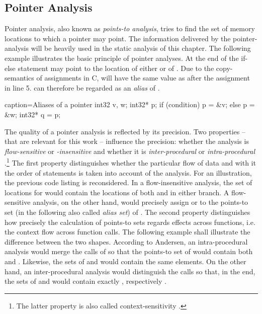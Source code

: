\subsection{Pointer Analysis}
Pointer analysis, also known as \textit{points-to analysis}, tries to find the set of memory locations to which a pointer may point\cite{PointerAnalysisForStructuredParallelPrograms}. The information delivered by the pointer-analysis will be heavily used in the static analysis of this chapter. The following example illustrates the basic principle of pointer analyses. At the end of the if-else statement  may point to the location of either  or of . Due to the copy-semantics of assignments in C,  will have the same value as  after the assignment in line 5.  can therefore be regarded as an \textit{alias} of .
\begin{ccode}{caption=Aliases of a pointer}
int32 v, w;
int32* p;
if (condition)  p = &v;
else            p = &w; 
int32* q = p;
\end{ccode}
The quality of a pointer analysis is reflected by its precision. Two properties -- that are relevant for this work -- influence the precision: whether the analysis is \textit{flow-sensitive} or \textit{-insensitive} and whether it is \textit{inter-procedural} or \textit{intra-procedural} \cite{ProgramAnalysisAndSpecialization}.\footnote{The latter property is also called context-sensitivity \cite{CloningBasedContextSensitive}.} The first property distinguishes whether the particular flow of data and with it the order of statements is taken into account of the analysis. For an illustration, the previous code listing is reconsidered. In a flow-insensitive analysis, the set of locations for  would contain the locations of both  and  in either branch. A flow-sensitive analysis, on the other hand, would precisely assign  or  to the points-to set (in the following also called \textit{alias set}) of . The second property distinguishes how precisely the calculation of points-to sets regards effects across functions, i.e. the context flow across function calls. The following example shall illustrate the difference between the two shapes. According to Andersen, an intra-procedural analysis would merge the calls of  so that the points-to set of  would contain both  and . Likewise, the sets of  and  would contain the same elements. On the other hand, an inter-procedural analysis would distinguish the calls so that, in the end, the sets of  and  would contain exactly , respectively .
